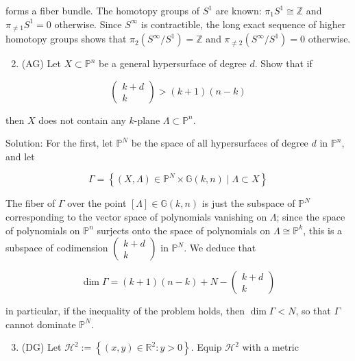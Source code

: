 \documentclass[10pt]{article}
\begin{document}
forms a fiber bundle. The homotopy groups of $S^{1}$ are known: $\pi_{1} S^{1} \cong \mathbb{Z}$ and $\pi_{\neq 1} S^{1}=0$ otherwise. Since $S^{\infty}$ is contractible, the long exact sequence of higher homotopy groups shows that $\pi_{2}\left(S^{\infty} / S^{1}\right)=\mathbb{Z}$ and $\pi_{\neq 2}\left(S^{\infty} / S^{1}\right)=0$ otherwise.

\begin{enumerate}
  \setcounter{enumi}{1}
  \item (AG) Let $X \subset \mathbb{P}^{n}$ be a general hypersurface of degree $d$. Show that if
\end{enumerate}

$$
\left(\begin{array}{c}
k+d \\
k
\end{array}\right)>(k+1)(n-k)
$$

then $X$ does not contain any $k$-plane $\Lambda \subset \mathbb{P}^{n}$.

Solution: For the first, let $\mathbb{P}^{N}$ be the space of all hypersurfaces of degree $d$ in $\mathbb{P}^{n}$, and let

$$
\Gamma=\left\{(X, \Lambda) \in \mathbb{P}^{N} \times \mathbb{G}(k, n) \mid \Lambda \subset X\right\}
$$

The fiber of $\Gamma$ over the point $[\Lambda] \in \mathbb{G}(k, n)$ is just the subspace of $\mathbb{P}^{N}$ corresponding to the vector space of polynomials vanishing on $\Lambda$; since the space of polynomials on $\mathbb{P}^{n}$ surjects onto the space of polynomials on $\Lambda \cong \mathbb{P}^{k}$, this is a subspace of codimension $\left(\begin{array}{c}k+d \\ k\end{array}\right)$ in $\mathbb{P}^{N}$. We deduce that

$$
\operatorname{dim} \Gamma=(k+1)(n-k)+N-\left(\begin{array}{c}
k+d \\
k
\end{array}\right)
$$

in particular, if the inequality of the problem holds, then $\operatorname{dim} \Gamma<N$, so that $\Gamma$ cannot dominate $\mathbb{P}^{N}$.

\begin{enumerate}
  \setcounter{enumi}{2}
  \item (DG) Let $\mathcal{H}^{2}:=\left\{(x, y) \in \mathbb{R}^{2}: y>0\right\}$. Equip $\mathcal{H}^{2}$ with a metric
\end{enumerate}
\end{document}
